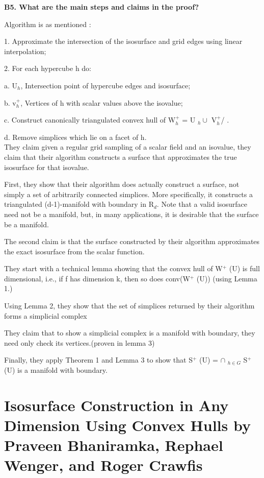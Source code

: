 \documentclass{article}[12pt]
\begin{document}
\vspace{2ex}\noindent
{ \bf B5. What are the main steps and claims in the proof?  }
{
   
    Algorithm is as mentioned : 

    1.   Approximate  the intersection of the isosurface and grid edges using linear interpolation;

    2.   For each hypercube h do:

    a.   U$_{h}$,  Intersection  point of hypercube edges and isosurface;

    b.   v$^{+}_{h}$,  Vertices of h with scalar values above the isovalue;

    c.   Construct canonically  triangulated convex  hull of  W$^{+}_{h}$ = U $_{h} \cup$  V$^{+}_{h}$/ .

    d.   Remove simplices  which lie on a facet of h. \\
    
    They claim given a regular grid sampling of a scalar field and an isovalue, they claim that their algorithm constructs a surface that approximates the true isosurface for that isovalue.
    
    First, they show that their algorithm does actually construct a surface, not simply a set of arbitrarily connected simplices. More specifically, it constructs a triangulated (d-1)-manifold with boundary in R$_{d}$. Note that a valid isosurface need not be a manifold, but, in many applications, it is desirable that the surface be a manifold.
    
    The second claim is that the surface constructed by their algorithm approximates the exact isosurface from the     scalar function.
    
    They start with a technical lemma showing that the convex hull of W$^{+}$ (U) is full dimensional, i.e., if f has dimension k, then so does conv(W$^{+}$ (U)) (using Lemma 1.)
    
    Using Lemma 2, they show that the set of simplices returned by their algorithm forms a simplicial complex
    
    They claim that to show a simplicial complex is a manifold with boundary, they need only check its vertices.(proven in lemma 3) 
    
    Finally, they apply Theorem 1 and Lemma 3 to show that S$^{+}$ (U) = $\cap$ $ _{h \in G}$ S$^{+}$(U) is a manifold with boundary.
    
}

\section{Isosurface Construction in Any Dimension Using Convex Hulls by Praveen Bhaniramka, Rephael Wenger, and Roger Crawfis}
\hfill \break
\end{document}

